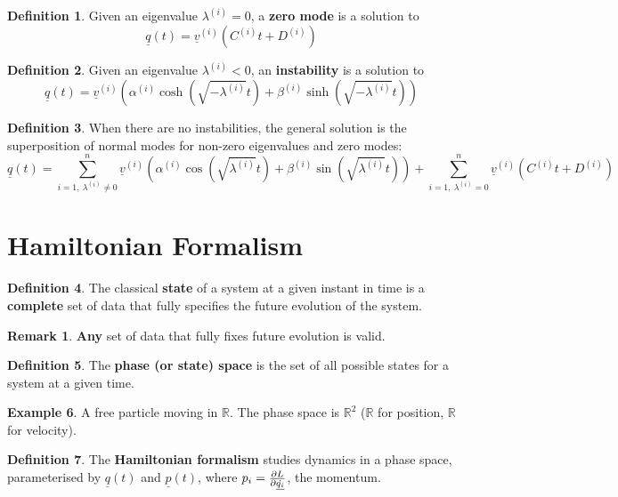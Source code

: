 \documentclass[12pt,a4paper]{article}
\theoremstyle{definition}
\newtheorem{definition}{Definition}[subsection]
\newtheorem{example}[definition]{Example}
\newtheorem*{remark}{Remark}
\begin{document}
\begin{definition}
	Given an eigenvalue $\lambda^{(i)} = 0$, a \textbf{zero mode} is a solution to
	\[
		\underline{q}(t) = \underline{v}^{(i)} \left( C^{(i)} t + D^{(i)} \right)
	\]
\end{definition}

\begin{definition}
	Given an eigenvalue $\lambda^{(i)} < 0$, an \textbf{instability} is a solution to
	\[
		\underline{q}(t) = \underline{v}^{(i)} \left( \alpha^{(i)} \cosh(\sqrt{-\lambda^{(i)}} t) + \beta^{(i)} \sinh(\sqrt{-\lambda^{(i)}} t) \right)
	\]
\end{definition}

\begin{definition}
	When there are no instabilities, the general solution is the superposition of normal modes for non-zero eigenvalues and zero modes:
	\[
		\underline{q}(t) = \sum_{i = 1, \ \lambda^{(i)} \ne 0}^{n} \underline{v}^{(i)} \left( \alpha^{(i)} \cos(\sqrt{\lambda^{(i)}} t) + \beta^{(i)} \sin(\sqrt{\lambda^{(i)}} t) \right) + \sum_{i = 1, \ \lambda^{(i)} = 0}^{n} \underline{v}^{(i)} \left( C^{(i)} t + D^{(i)} \right)
	\]
\end{definition}

\section{Hamiltonian Formalism}

\begin{definition}
	The classical \textbf{state} of a system at a given instant in time is a \textbf{complete} set of data that fully specifies the future evolution of the system.
\end{definition}

\begin{remark}
	\textbf{Any} set of data that fully fixes future evolution is valid.
\end{remark}

\begin{definition}
	The \textbf{phase (or state) space} is the set of all possible states for a system at a given time.
\end{definition}

\begin{example}
	A free particle moving in $\mathbb{R}$. The phase space is $\mathbb{R}^2$ ($\mathbb{R}$ for position, $\mathbb{R}$ for velocity).
\end{example}

\begin{definition}
	The \textbf{Hamiltonian formalism} studies dynamics in a phase space, parameterised by $\underline{q}(t)$ and $\underline{p}(t)$, where $p_i = \diffp{L}{\dot{\underline{q_i}}}$, the momentum.
\end{definition}
\end{document}
